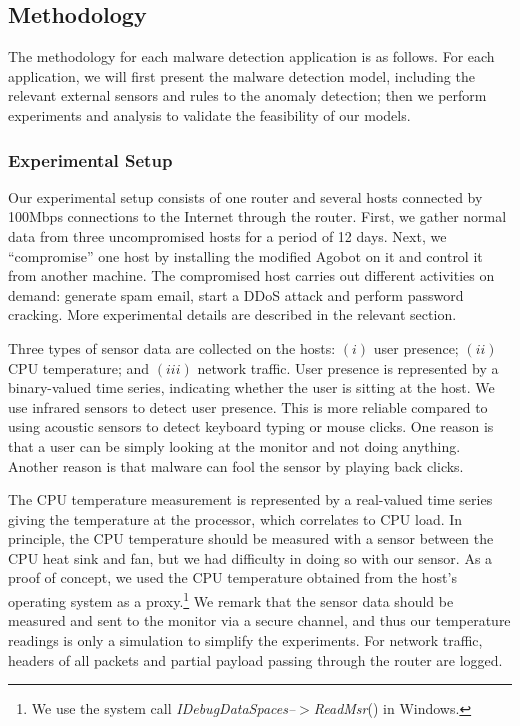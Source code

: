 \subsection{Methodology}

The methodology for each malware detection application is as follows.  For each
application, we will first present the malware detection model, including the
relevant external sensors and rules to the anomaly detection; then we perform
experiments and analysis to validate the feasibility of our models.

\subsubsection{Experimental Setup}
Our experimental setup consists
of one router and
several hosts connected by 100Mbps connections to the Internet
through the router. First, we gather normal data from three
uncompromised hosts for a period of 12 days. Next, we ``compromise''
one host by installing the modified Agobot on it and control it from
another machine. The compromised host carries out
different activities on demand: generate spam email, start a DDoS
attack and perform password cracking.
More experimental details are described in the relevant section.

Three types of sensor data are collected on the hosts: $(i)$
user presence; $(ii)$ CPU temperature; and $(iii)$ network traffic.
User presence is represented by a binary-valued time series,
indicating whether the user is sitting at the host.
We use infrared sensors to detect user presence.
This is more reliable compared
to using acoustic sensors to detect keyboard typing or mouse clicks.
One reason is that a user can be simply looking at the monitor and not
doing anything.
Another reason is that malware can fool the sensor by playing back clicks.

The CPU temperature measurement
is represented by a real-valued time series giving the
temperature at the processor, which correlates to CPU load. In
principle, the CPU temperature should be measured with a sensor
between the CPU heat sink and fan, but we had difficulty in doing so
with our sensor. As a proof of concept, we used the CPU
temperature obtained from the host's operating system as a
proxy.\footnote{We use the
system call \emph{IDebugDataSpaces--$>$ReadMsr}() in Windows.
}
We remark that the sensor data should be measured and sent to the
monitor via a secure channel, and thus our temperature readings
is only a simulation to simplify the experiments.
For network traffic, headers of all packets and partial payload
passing through the router are logged.

